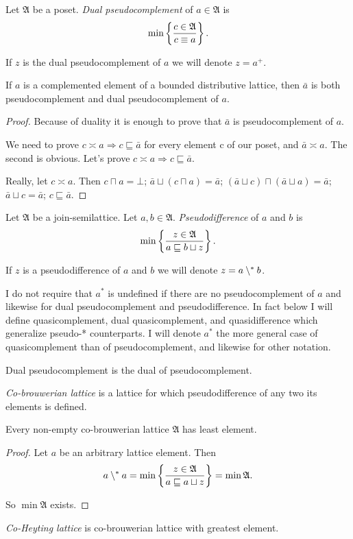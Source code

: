 \begin{defn}
Let $\mathfrak{A}$ be a poset. \emph{Dual
pseudocomplement} of $a\in\mathfrak{A}$ is
\[
\min\left\{ \frac{c\in\mathfrak{A}}{c\equiv a}\right\}.
\]


If $z$ is the dual pseudocomplement of $a$ we will denote $z=a^{+}$.\end{defn}
\begin{prop}\label{compl-is-pseud}
If $a$ is a complemented element of a bounded distributive lattice,
then $\bar{a}$ is both pseudocomplement and dual pseudocomplement
of $a$.\end{prop}
\begin{proof}
Because of duality it is enough to prove that $\bar{a}$ is pseudocomplement
of $a$.

We need to prove $c\asymp a\Rightarrow c\sqsubseteq\bar{a}$ for every
element c of our poset, and $\bar{a}\asymp a$. The second is obvious.
Let's prove $c\asymp a\Rightarrow c\sqsubseteq\bar{a}$.

Really, let $c\asymp a$. Then $c\sqcap a=\bot$; $\bar{a}\sqcup(c\sqcap a)=\bar{a}$;
$(\bar{a}\sqcup c)\sqcap(\bar{a}\sqcup a)=\bar{a}$; $\bar{a}\sqcup c=\bar{a}$;
$c\sqsubseteq\bar{a}$.\end{proof}
\begin{defn}
Let $\mathfrak{A}$ be a join-semilattice.
Let $a,b\in\mathfrak{A}$. \emph{Pseudodifference} of $a$ and $b$
is
\[
\min\left\{ \frac{z\in\mathfrak{A}}{a\sqsubseteq b\sqcup z}\right\}.
\]


If $z$ is a pseudodifference of $a$ and $b$ we will denote $z=a\setminus^{\ast} b$.\end{defn}
\begin{rem}
I do not require that $a^{\ast}$ is undefined if there are no pseudocomplement
of $a$ and likewise for dual pseudocomplement and pseudodifference.
In fact below I will define quasicomplement, dual quasicomplement,
and quasidifference which generalize pseudo-{*} counterparts. I will
denote $a^{\ast}$ the more general case of quasicomplement than of
pseudocomplement, and likewise for other notation.\end{rem}
\begin{obvious}
Dual pseudocomplement is the dual of pseudocomplement.\end{obvious}
\begin{defn}
\emph{Co-brouwerian lattice} is a lattice
for which pseudodifference of any two its elements is defined.\end{defn}
\begin{prop}
Every non-empty co-brouwerian lattice $\mathfrak{A}$ has least element.\end{prop}
\begin{proof}
Let $a$ be an arbitrary lattice element. Then
\[
a\setminus^{\ast} a=\min\left\{ \frac{z\in\mathfrak{A}}{a\sqsubseteq a\sqcup z}\right\}=\min\mathfrak{A}.
\]


So $\min\mathfrak{A}$ exists.\end{proof}
\begin{defn}
\emph{Co-Heyting lattice} is co-brouwerian
lattice with greatest element.
\end{defn}

